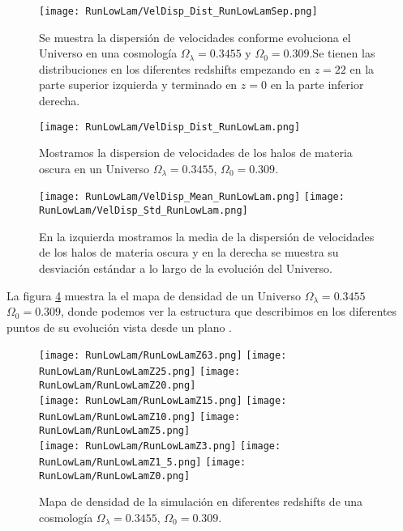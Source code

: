 \begin{figure}[H]
    \centering
    \texttt{[image: RunLowLam/VelDisp\_Dist\_RunLowLamSep.png]}
    \caption[Dispersión de velocidades]{\footnotesize Se muestra la dispersión de velocidades conforme evoluciona el Universo en una cosmología $\Omega_\lambda = 0.3455$ y $\Omega_0 = 0.309$.Se tienen las distribuciones en los diferentes redshifts empezando en $z=22$ en la parte superior izquierda y terminado en $z=0$ en la parte inferior derecha.}
    \label{fig:LowLam-VelDispDistSep}
\end{figure}

\begin{figure}[H]
    \centering
    \texttt{[image: RunLowLam/VelDisp\_Dist\_RunLowLam.png]}
    \caption[Distribución de la dispersión de velocidades]{\footnotesize Mostramos la dispersion de velocidades de los halos de materia oscura en un Universo $\Omega_\lambda = 0.3455$, $\Omega_0 = 0.309$.}
    \label{fig:LowLam-VelDispDist}
\end{figure}

\begin{figure}[H]
    \centering
    \texttt{[image: RunLowLam/VelDisp\_Mean\_RunLowLam.png]}
    \texttt{[image: RunLowLam/VelDisp\_Std\_RunLowLam.png]}
    \caption[Media y desviación estándar de la dispersión de velocidades]{\footnotesize En la izquierda mostramos la media de la dispersión de velocidades de los halos de materia oscura y en la derecha se muestra su desviación estándar a lo largo de la evolución del Universo.}
    \label{fig:LowLam-VelDispStats}
\end{figure}

La figura \ref{fig:LowLam-DensityMap} muestra la el mapa de densidad de un Universo $\Omega_\lambda = 0.3455$ $\Omega_0 = 0.309$, donde podemos ver la estructura que describimos  en los diferentes puntos de su evolución vista desde un plano .
\begin{figure}[H]
    \centering

    \texttt{[image: RunLowLam/RunLowLamZ63.png]}   %
    \texttt{[image: RunLowLam/RunLowLamZ25.png]}   %
    \texttt{[image: RunLowLam/RunLowLamZ20.png]}   %
    \\
    \texttt{[image: RunLowLam/RunLowLamZ15.png]}   %
    \texttt{[image: RunLowLam/RunLowLamZ10.png]}   %
    \texttt{[image: RunLowLam/RunLowLamZ5.png]}    %
    \\
    \texttt{[image: RunLowLam/RunLowLamZ3.png]}    %
    \texttt{[image: RunLowLam/RunLowLamZ1\_5.png]}  %
    \texttt{[image: RunLowLam/RunLowLamZ0.png]}    %
    \caption[Mapa de densidad en en diferentes redshift]{ \footnotesize Mapa de densidad de la simulación en diferentes redshifts de una cosmología $\Omega_\lambda = 0.3455$, $\Omega_0 = 0.309$. }
    \label{fig:LowLam-DensityMap}
\end{figure}


